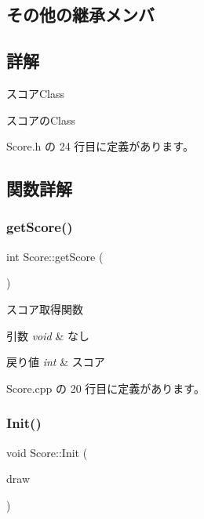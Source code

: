 \subsection*{その他の継承メンバ}


\subsection{詳解}
スコア\+Class 

スコアの\+Class 

 Score.\+h の 24 行目に定義があります。



\subsection{関数詳解}
\mbox{\label{class_score_a8627c93270c188a3fd28a25b1d07a9e7}} 
\subsubsection{\texorpdfstring{get\+Score()}{getScore()}}
{\footnotesize\ttfamily int Score\+::get\+Score (\begin{DoxyParamCaption}{ }\end{DoxyParamCaption})}



スコア取得関数 


\begin{DoxyParams}{引数}
{\em void} & なし \\
\hline
\end{DoxyParams}

\begin{DoxyRetVals}{戻り値}
{\em int} & スコア \\
\hline
\end{DoxyRetVals}


 Score.\+cpp の 20 行目に定義があります。

\mbox{\label{class_score_ab75a9a16b40fc6e424740db1ff6f1917}} 
\subsubsection{\texorpdfstring{Init()}{Init()}}
{\footnotesize\ttfamily void Score\+::\+Init (\begin{DoxyParamCaption}\item[{\mbox{\hyperlink{class_draw_base}{Draw\+Base}} $\ast$}]{draw }\end{DoxyParamCaption})}



